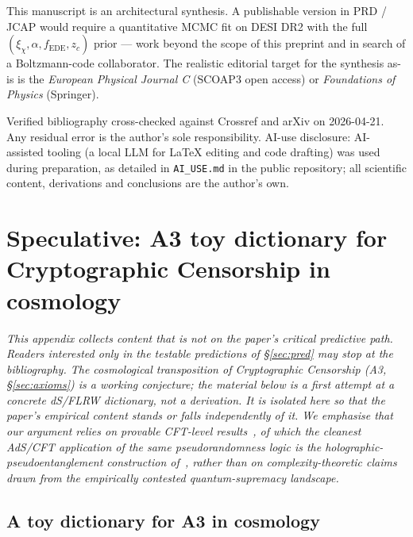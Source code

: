 \documentclass[epjc3,twocolumn]{svjour3}
\begin{document}
This manuscript is an architectural synthesis. A publishable version in PRD / JCAP would require a quantitative MCMC fit on DESI DR2 with the full $(\xi_\chi, \alpha, f_{\mathrm{EDE}}, z_c)$ prior --- work beyond the scope of this preprint and in search of a Boltzmann-code collaborator. The realistic editorial target for the synthesis as-is is the \emph{European Physical Journal C} (SCOAP3 open access) or \emph{Foundations of Physics} (Springer).

\begin{acknowledgements}
Verified bibliography cross-checked against Crossref and arXiv on 2026-04-21. Any residual error is the author's sole responsibility. AI-use disclosure: AI-assisted tooling (a local LLM for LaTeX editing and code drafting) was used during preparation, as detailed in \texttt{AI\_USE.md} in the public repository; all scientific content, derivations and conclusions are the author's own.
\end{acknowledgements}




\clearpage
\appendix
\section{Speculative: A3 toy dictionary for Cryptographic Censorship in cosmology}
\label{app:A3-speculative}

\emph{This appendix collects content that is not on the paper's critical predictive path.
Readers interested only in the testable predictions of \S\ref{sec:pred} may stop at the bibliography.
The cosmological transposition of Cryptographic Censorship (A3, \S\ref{sec:axioms}) is a working
conjecture; the material below is a first attempt at a concrete dS/FLRW dictionary, not
a derivation. It is isolated here so that the paper's empirical content stands or falls
independently of it. We emphasise that our argument relies on provable CFT-level
results~\cite{CryptoCensorship,MaHuang2025}, of which the cleanest AdS/CFT application
of the same pseudorandomness logic is the holographic-pseudoentanglement construction
of~\cite{HolographicPseudoEnt2024}, rather than on complexity-theoretic claims drawn
from the empirically contested quantum-supremacy landscape.}

\subsection{A toy dictionary for A3 in cosmology}\label{sec:A3-dictionary}
\end{document}
